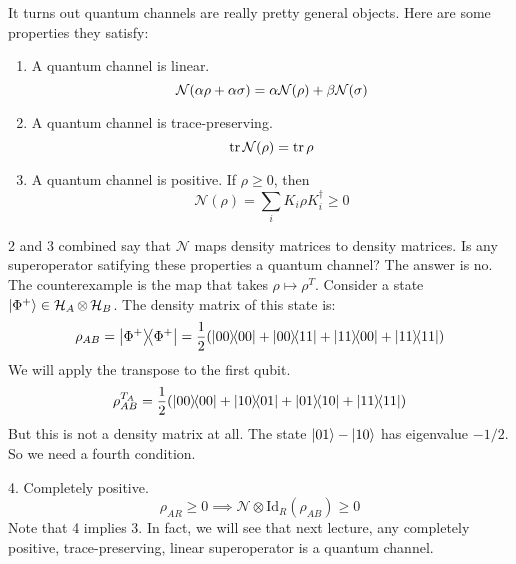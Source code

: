 It turns out quantum channels are really pretty general objects. Here are some properties they satisfy:
\begin{enumerate}
    \item A quantum channel is linear.
    \[ \mathcal{N}\qty(\alpha \rho + \alpha \sigma) = \alpha \mathcal{N}(\rho) + \beta \mathcal{N}(\sigma) \]
    \item A quantum channel is trace-preserving.
    \[ \tr \mathcal{N}(\rho) = \tr \rho \]
    \item A quantum channel is positive. If $\rho \geq 0$, then
    \[ \mathcal{N}(\rho) = \sum_i K_i \rho K_i^{\dagger} \geq 0 \]
\end{enumerate}
2 and 3 combined say that $\mathcal{N}$ maps density matrices to density matrices. Is any superoperator satifying
these properties a quantum channel? The answer is no. The counterexample is the map that takes $\rho \mapsto \rho^T$.
Consider a state $\ket{\Phi^+} \in \operatorname{\mathcal{H}}_A \otimes \operatorname{\mathcal{H}}_B$. The density matrix of this state is:
\[ \rho_{AB} = \ketbra{\Phi^+} = \frac{1}{2} \qty(\ketbra{00} + \ketbra{00}{11} + \ketbra{11}{00} + \ketbra{11}) \]
We will apply the transpose to the first qubit.
\[ \rho_{AB}^{T_A} = \frac{1}{2} \qty(\ketbra{00} + \ketbra{10}{01} + \ketbra{01}{10} + \ketbra{11}) \]
But this is not a density matrix at all. The state $\ket{01} - \ket{10}$ has eigenvalue $-1/2$. So we need a fourth condition.

4. Completely positive. 
\[ \rho_{AR} \geq 0 \implies \mathcal{N} \otimes \textrm{Id}_R(\rho_{AB}) \geq 0\]
Note that 4 implies 3. In fact, we will see that next lecture, any completely positive, trace-preserving,
linear superoperator is a quantum channel.